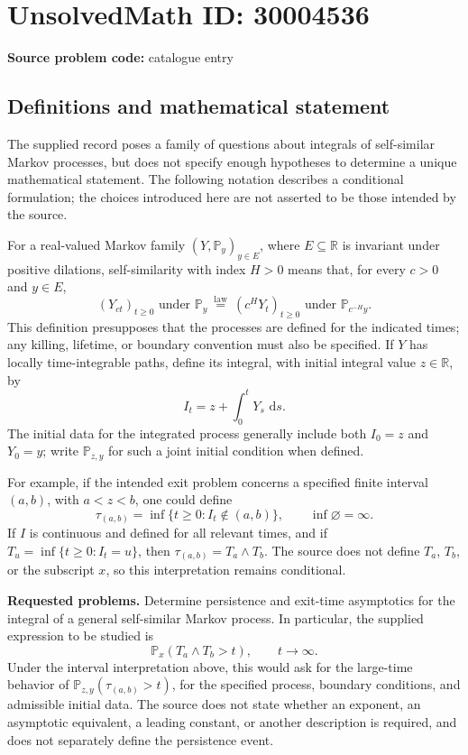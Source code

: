 \documentclass[11pt]{article}
\newcommand{\R}{\mathbb{R}}
\newcommand{\dd}{\,\mathrm{d}}
\begin{document}
\section*{UnsolvedMath ID: 30004536}
\textbf{Source problem code:} catalogue entry
\subsection{Definitions and mathematical statement}
The supplied record poses a family of questions about integrals of self-similar Markov processes, but does not specify enough hypotheses to determine a unique mathematical statement. The following notation describes a conditional formulation; the choices introduced here are not asserted to be those intended by the source.

For a real-valued Markov family \((Y,\mathbb P_y)_{y\in E}\), where \(E\subseteq\R\) is invariant under positive dilations, self-similarity with index \(H>0\) means that, for every \(c>0\) and \(y\in E\),
\[
 (Y_{ct})_{t\geq0}\text{ under }\mathbb P_y
 \ \stackrel{\mathrm{law}}{=}\ 
 (c^H Y_t)_{t\geq0}\text{ under }\mathbb P_{c^{-H}y}.
\]
This definition presupposes that the processes are defined for the indicated times; any killing, lifetime, or boundary convention must also be specified. If \(Y\) has locally time-integrable paths, define its integral, with initial integral value \(z\in\R\), by
\[
 I_t=z+\int_0^t Y_s\,\dd s.
\]
The initial data for the integrated process generally include both \(I_0=z\) and \(Y_0=y\); write \(\mathbb P_{z,y}\) for such a joint initial condition when defined.

For example, if the intended exit problem concerns a specified finite interval \((a,b)\), with \(a<z<b\), one could define
\[
 \tau_{(a,b)}=\inf\{t\geq0:I_t\notin(a,b)\},
 \qquad \inf\varnothing=\infty.
\]
If \(I\) is continuous and defined for all relevant times, and if \(T_u=\inf\{t\geq0:I_t=u\}\), then \(\tau_{(a,b)}=T_a\wedge T_b\). The source does not define \(T_a\), \(T_b\), or the subscript \(x\), so this interpretation remains conditional.

\textbf{Requested problems.} Determine persistence and exit-time asymptotics for the integral of a general self-similar Markov process. In particular, the supplied expression to be studied is
\[
 \mathbb P_x(T_a\wedge T_b>t),\qquad t\longrightarrow\infty.
\]
Under the interval interpretation above, this would ask for the large-time behavior of \(\mathbb P_{z,y}(\tau_{(a,b)}>t)\), for the specified process, boundary conditions, and admissible initial data. The source does not state whether an exponent, an asymptotic equivalent, a leading constant, or another description is required, and does not separately define the persistence event.
\end{document}
